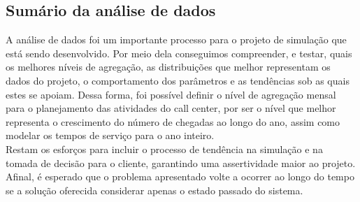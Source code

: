 \subsection{Sumário da análise de dados}
A análise de dados foi um importante processo para o projeto de simulação que está sendo desenvolvido. Por meio dela conseguimos compreender, e testar, quais os melhores níveis de agregação, as distribuições que melhor representam os dados do projeto, o comportamento dos parâmetros e as tendências sob as quais estes se apoiam. Dessa forma, foi possível definir o nível de agregação mensal para o planejamento das atividades do call center, por ser o nível que melhor representa o crescimento do número de chegadas ao longo do ano, assim como modelar os tempos de serviço para o ano inteiro.\\
Restam os esforços para incluir o processo de tendência na simulação e na tomada de decisão para o cliente, garantindo uma assertividade maior ao projeto. Afinal, é esperado que o problema apresentado volte a ocorrer ao longo do tempo se a solução oferecida considerar apenas o estado passado do sistema.